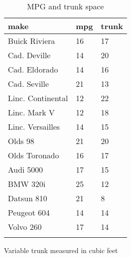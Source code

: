 \documentclass{article}
\begin{document}
\begin{table}[tbp] \centering
{}

\caption{MPG and trunk space}
\begin{tabularx}{\linewidth}{lCC}

\toprule
{make}&{mpg}&{trunk} \tabularnewline
\midrule \addlinespace[\belowrulesep]
Buick Riviera&16&17 \tabularnewline
Cad. Deville&14&20 \tabularnewline
Cad. Eldorado&14&16 \tabularnewline
Cad. Seville&21&13 \tabularnewline
Linc. Continental&12&22 \tabularnewline
Linc. Mark V&12&18 \tabularnewline
Linc. Versailles&14&15 \tabularnewline
Olds 98&21&20 \tabularnewline
Olds Toronado&16&17 \tabularnewline
Audi 5000&17&15 \tabularnewline
BMW 320i&25&12 \tabularnewline
Datsun 810&21&8 \tabularnewline
Peugeot 604&14&14 \tabularnewline
Volvo 260&17&14 \tabularnewline
\bottomrule \addlinespace[\belowrulesep]

\end{tabularx}
\begin{flushleft}
\footnotesize Variable trunk measured in cubic feet
\end{flushleft}
\end{table}
\end{document}
